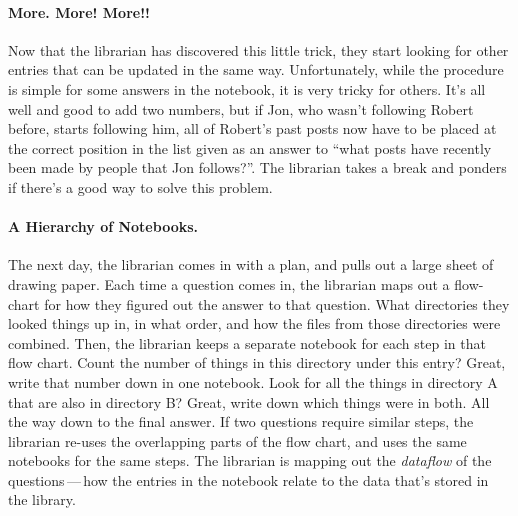 \paragraph{More. More! More!!}
%
Now that the librarian has discovered this little trick, they start looking for
other entries that can be updated in the same way. Unfortunately, while the
procedure is simple for some answers in the notebook, it is very tricky for
others. It's all well and good to add two numbers, but if Jon, who wasn't
following Robert before, starts following him, all of Robert's past posts now
have to be placed at the correct position in the list given as an answer to
``what posts have recently been made by people that Jon follows?''. The
librarian takes a break and ponders if there's a good way to solve this problem.

\paragraph{A Hierarchy of Notebooks.}
%
The next day, the librarian comes in with a plan, and pulls out a large sheet of
drawing paper. Each time a question comes in, the librarian maps out a
flow-chart for how they figured out the answer to that question. What
directories they looked things up in, in what order, and how the files from
those directories were combined. Then, the librarian keeps a separate notebook
for each step in that flow chart. Count the number of things in this directory
under this entry? Great, write that number down in one notebook. Look for all
the things in directory A that are also in directory B? Great, write down which
things were in both. All the way down to the final answer. If two questions
require similar steps, the librarian re-uses the overlapping parts of the flow
chart, and uses the same notebooks for the same steps. The librarian is mapping
out the \textit{dataflow} of the questions\,---\,how the entries in the notebook
relate to the data that's stored in the library.

